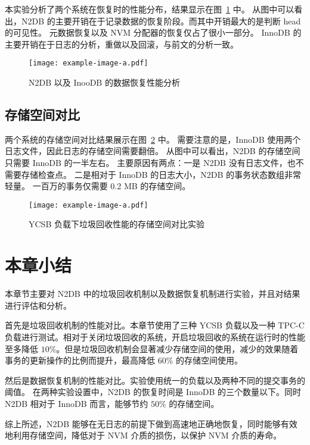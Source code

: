 本实验分析了两个系统在恢复时的性能分布，结果显示在图~\ref{fig:recovery-time-analysis} 中。
从图中可以看出，N2DB 的主要开销在于记录数据的恢复阶段。而其中开销最大的是判断 head 的可见性。
元数据恢复以及 NVM 分配器的恢复仅占了很小一部分。
InnoDB 的主要开销在于日志的分析，重做以及回滚，与前文的分析一致。


\begin{figure}
    \centering
    \texttt{[image: example-image-a.pdf]}
    \caption{N2DB 以及 InooDB 的数据恢复性能分析}
    \label{fig:recovery-time-analysis}
\end{figure}


\subsection{存储空间对比}

两个系统的存储空间对比结果展示在图~\ref{fig:recovery-storage-ycsb} 中。
需要注意的是，InnoDB 使用两个日志文件，因此日志的存储空间需要翻倍。
从图中可以看出，N2DB 的存储空间只需要 InnoDB 的一半左右。
主要原因有两点：一是 N2DB 没有日志文件，也不需要存储检查点。
二是相对于 InnoDB 的日志大小，N2DB 的事务状态数组非常轻量。
一百万的事务仅需要 0.2 MB 的存储空间。

\begin{figure}
    \centering
    \texttt{[image: example-image-a.pdf]}
    \caption{YCSB 负载下垃圾回收性能的存储空间对比实验}
    \label{fig:recovery-storage-ycsb}
\end{figure}



\section{本章小结}

本章节主要对 N2DB 中的垃圾回收机制以及数据恢复机制进行实验，并且对结果进行评估和分析。

首先是垃圾回收机制的性能对比。本章节使用了三种 YCSB 负载以及一种 TPC-C 负载进行测试。相对于关闭垃圾回收的系统，开启垃圾回收的系统在运行时的性能至多降低 $10\%$。但是垃圾回收机制会显著减少存储空间的使用，减少的效果随着事务的更新操作的比例而提升，最高降低 $60\%$ 的存储空间使用。

然后是数据恢复机制的性能对比。实验使用统一的负载以及两种不同的提交事务的阈值。
在两种实验设置中，N2DB 的恢复时间是 InnoDB 的三个数量以下。同时 N2DB 相对于 InnoDB 而言，能够节约 $50\%$ 的存储空间。

综上所述，N2DB 能够在无日志的前提下做到高速地正确地恢复，同时能够有效地利用存储空间，降低对于 NVM 介质的损伤，以保护 NVM 介质的寿命。

